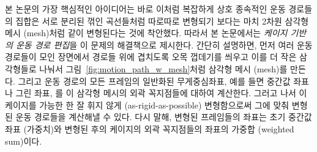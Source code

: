 \documentclass[12pt,a4paper,oneside,final]{report}
\begin{document}
본 논문의 가장 핵심적인 아이디어는 바로 이처럼 복잡하게 상호 종속적인 운동
경로들의 집합은 서로 분리된 꺾인 곡선들처럼 따로따로 변형되기 보다는 마치 2차원
삼각형 메시 (mesh)처럼 같이 변형된다는 것에 착안했다.  따라서 본 논문에서는
\emph{케이지 기반의 운동 경로 편집}을 이 문제의 해결책으로 제시한다. 간단히
설명하면, 먼저 여러 운동 경로들이 모인 장면에서 경로들 위에 겹치도록 오목
껍데기를 씌우고 이를 더 작은 삼각형들로 나눠서
그림~\ref{fig:motion_path_w_mesh}처럼 삼각형 메시 (mesh)를 만든다. 그리고 운동
경로의 모든 프레임의 일반화된 무게중심좌표, 예를 들면 중간값 좌표나 그린 좌표,
를 이 삼각형 메시의 외곽 꼭지점들에 대하여 계산한다. 그러고 나서 이 케이지를
가능한 한 잘 휘지 않게 (as-rigid-as-possible) 변형함으로써 그에 맞춰 변형된
운동 경로들을 계산해낼 수 있다. 다시 말해, 변형된 프레임들의 좌표는 초기 중간값
좌표 (가중치)와 변형된 후의 케이지의 외곽 꼭지점들의 좌표의 가중합 (weighted
sum)이다.


%

%
%
\end{document}
